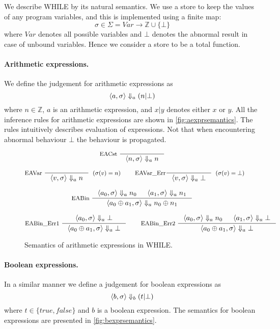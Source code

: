 We describe WHILE by its natural semantics.
We use a store to keep the values of any program variables, and this is implemented using a finite map:
$$\sigma \in \Sigma = Var \longrightarrow \mathbb{Z} \cup \{\bot\}$$
where $Var$ denotes all possible variables and $\bot$ denotes the abnormal result in case of unbound variables.
Hence we consider a store to be a total function.

\paragraph{Arithmetic expressions.}
We define the judgement for arithmetic expressions as
\[
  \langle a,\sigma \rangle \Downarrow_{a} (n | \bot)
\]
where $n \in \mathbb{Z}$, $a$ is an arithmetic expression, and $x | y$ denotes either $x$ or $y$.
All the inference rules for arithmetic expressions are shown in \autoref{fig:aexprsemantics}.
The rules intuitively describes evaluation of expressions. Not that when encountering abnormal behaviour $\bot$ the behaviour is propagated.

\begin{figure}[h!]
\begin{equation*}
\inference[EACst ]{}
{\judgea{n,\sigma}{n}}
\end{equation*}

\begin{equation*}
\inference[EAVar ]{}
{\judgea{v,\sigma}{n}}[$(\sigma(v) = n)$]
\qquad
\inference[EAVar\_Err]{}
{\judgea{v,\sigma}{\bot}}[$( \sigma(v) = \bot )$]
\end{equation*}

\begin{equation*}
\inference[EABin ]{\judgea{a_{0}, \sigma}{n_{0}} & \judgea{a_{1}, \sigma}{n_{1}}}
{\judgea{a_{0} \oplus a_{1},\sigma}{n_{0} \oplus n_{1}}}
\end{equation*}

\begin{equation*}
\inference[EABin\_Err1 ]{\judgea{a_{0}, \sigma}{\bot}}
{\judgea{a_{0} \oplus a_{1},\sigma}{\bot}}
\qquad
\inference[EABin\_Err2 ]{\judgea{a_{0}, \sigma}{n_{0}} & \judgea{a_{1}, \sigma}{\bot}}
{\judgea{a_{0} \oplus a_{1},\sigma}{\bot}}
\end{equation*}
\caption{Semantics of arithmetic expressions in WHILE.}
\label{fig:aexprsemantics}
\end{figure}

\paragraph{Boolean expressions.}
In a similar manner we define a judgement for boolean expressions as
$$\langle b,\sigma \rangle \Downarrow_{b} (t | \bot)$$
where $t \in \{true, false\}$ and $b$ is a boolean expression.
The semantics for boolean expressions are presented in \autoref{fig:bexprsemantics}.

